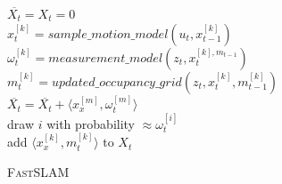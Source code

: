 \documentclass[a4paper,11pt]{article}
\begin{document}
\begin{algorithm}[H]
\label{algo1}
    \SetNlSty{}{}{:}
    \SetInd{1em}{1em}
    
    \BlankLine
    
    $ \overline{X_t} = X_t = 0 $ \\
    { 
    $x_t^{[k]} = sample\_motion\_model(u_t,x_{t-1}^{[k]})$ \\
    $\omega_t^{[k]} = measurement\_model(z_t,x_{t}^{[k],m_{t-1}})$ \\
    $m_t^{[k]} =updated\_occupancy\_grid(z_t,x_{t}^{[k]},m_{t-1}^{[k]})$ \\
    $\overline{X_t} = \overline{X_t} + \langle x_x^{[m]}, \omega_t^{[m]} \rangle$ \\
    }
    {
        draw $i$ with probability $ \approx\omega_t^{[i]}$ \\
		add $\langle x_x^{[k]}, m_t^{[k]} \rangle\textrm{ to }X_t$ \\
    }
    \caption{\textsc{FastSLAM}}
\end{algorithm}
\vspace{2em}
\end{document}
